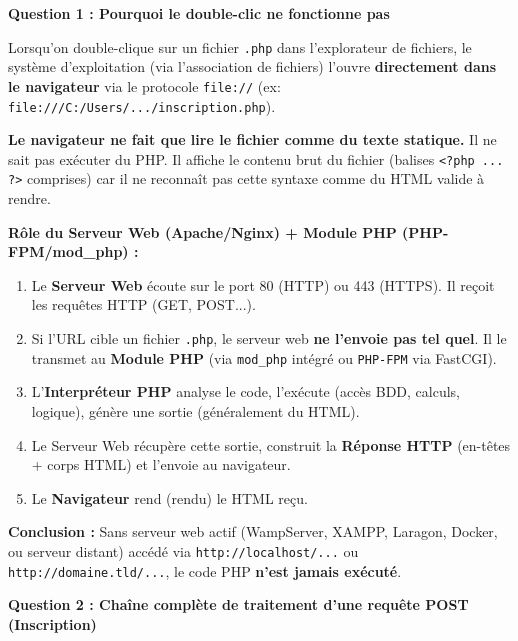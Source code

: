 \documentclass[11pt]{article}
\begin{document}
\begin{corrige}

\textbf{Question 1 : Pourquoi le double-clic ne fonctionne pas}

\begin{propriete}[Explication]
Lorsqu'on double-clique sur un fichier \texttt{.php} dans l'explorateur de fichiers, le système d'exploitation (via l'association de fichiers) l'ouvre \textbf{directement dans le navigateur} via le protocole \texttt{file://} (ex: \texttt{file:///C:/Users/.../inscription.php}).

\textbf{Le navigateur ne fait que lire le fichier comme du texte statique.} Il ne sait pas exécuter du PHP. Il affiche le contenu brut du fichier (balises \texttt{<?php ... ?>} comprises) car il ne reconnaît pas cette syntaxe comme du HTML valide à rendre.

\textbf{Rôle du Serveur Web (Apache/Nginx) + Module PHP (PHP-FPM/mod\_php) :}
\begin{enumerate}
    \item Le \textbf{Serveur Web} écoute sur le port 80 (HTTP) ou 443 (HTTPS). Il reçoit les requêtes HTTP (GET, POST...).
    \item Si l'URL cible un fichier \texttt{.php}, le serveur web \textbf{ne l'envoie pas tel quel}. Il le transmet au \textbf{Module PHP} (via \texttt{mod\_php} intégré ou \texttt{PHP-FPM} via FastCGI).
    \item L'\textbf{Interpréteur PHP} analyse le code, l'exécute (accès BDD, calculs, logique), génère une sortie (généralement du HTML).
    \item Le Serveur Web récupère cette sortie, construit la \textbf{Réponse HTTP} (en-têtes + corps HTML) et l'envoie au navigateur.
    \item Le \textbf{Navigateur} rend (rendu) le HTML reçu.
\end{enumerate}
\textbf{Conclusion :} Sans serveur web actif (WampServer, XAMPP, Laragon, Docker, ou serveur distant) accédé via \texttt{http://localhost/...} ou \texttt{http://domaine.tld/...}, le code PHP \textbf{n'est jamais exécuté}.
\end{propriete}

\textbf{Question 2 : Chaîne complète de traitement d'une requête POST (Inscription)}


\end{corrige}
\end{document}
